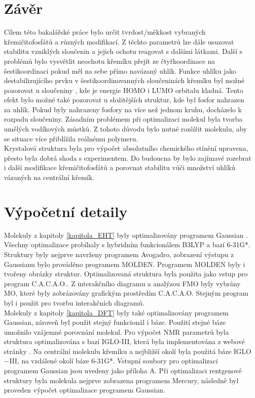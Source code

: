 \documentclass[
  digital, %
  table,   %
  lof,     %
  lot,     %
]{fithesis3}
\begin{document}
  \chapter{Závěr}
Cílem této bakalářské práce bylo určit tvrdost/měkkost vybraných křemičitofosfátů a různých modifikací. Z těchto parametrů lze dále usuzovat stabilitu vzniklých sloučenin a jejich ochotu reagovat s dalšími látkami. Další s problémů bylo vysvětlit neochotu křemíku přejít ze čtyřkoordinace na šestikoordinaci pokud měl na sebe přímo navázaný uhlík. Funkce uhlíku jako destabilizujícího prvku v šestikoordinovanných sloučeninách křemíku byl možné pozorovat u sloučeniny , kde je energie HOMO i LUMO orbitalu kladná. Tento efekt bylo možné také pozorovat u složitějších struktur, kde byl fosfor nahrazen za uhlík. Pokud byly nahrazeny fosfory na více než jednom kruhu, docházelo k rozpadu sloučeniny. Zásadním problémem při optimalizaci molekul byla tvorba umělých vodíkových můstků. Z tohoto důvodu bylo nutné rozšířit molekulu, aby se situace více přiblížila reálnému polymeru. \\
Krystalová struktura byla pro výpočet absolutního chemického stínění upravena, přesto byla dobrá shoda s experimentem. Do budoucna by bylo zajímavé rozebrat i další modifikace křemičitofosfátů a porovnat stabilitu vůči množství uhlíků vázaných na centrální křemík. 
  
  \chapter{Výpočetní detaily}
  Molekuly z kapitoly \ref{kapitola_EHT} byly optimalizovány programem Gaussian \cite{g09}. Všechny optimalizace probíhaly s hybridním funkcionálem B3LYP a bazí 6-31G*. Struktury byly nejprve navrženy programem Avogadro, zobrazení výstupu z Gaussianu bylo prováděno programem MOLDEN. Programem MOLDEN byly i tvořeny obrázky struktur. Optimalizovaná struktura byla použita jako vstup pro program C.A.C.A.O.. Z interakčního diagramu a analýzou FMO byly vybrány MO, které byly zobrázovány grafickým prostředím C.A.C.A.O. Stejným program byl i použit pro tvorbu interakčních diagramů. \\
  Molekuly z kapitoly \ref{kapitola_DFT} byly také optimalizovány programem Gaussian, zároveň byl použit stejný funkcionál i báze. Použití stejné báze umožnilo vzájemné porovnání molekul. Pro výpočet NMR parametrů byla struktura optimalizována s bazí IGLO-III, která byla implementována z webové stránky  . Na centrální molekulu křemíku a nejbližší okolí byla použitá báze IGLO$-$III, na vzdálené okolí báze 6-31G*. Vstupní soubory pro optimalizaci programem Gaussian jsou uvedeny jako příloha A. Při optimalizaci rentgenové struktury byla molekula nejprve zobrazena programem Mercury, následně byl proveden výpočet optimalizace programem Gaussian.
  
\end{document}
